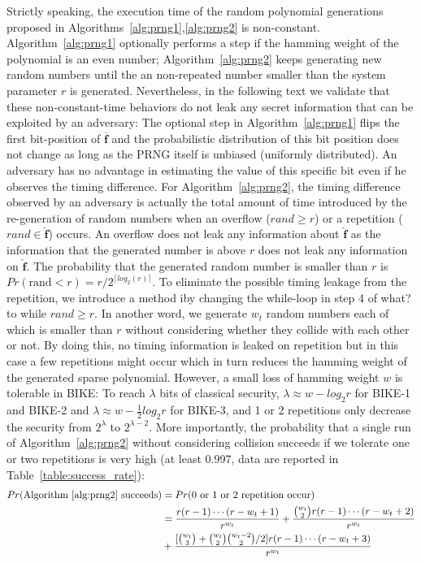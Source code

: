 \documentclass[runningheads]{llncs}
\begin{document}
Strictly speaking, the execution time of the random polynomial generations proposed in 
Algorithms~\ref{alg:prng1},\ref{alg:prng2} is non-constant. 
Algorithm~\ref{alg:prng1} optionally performs a step if the 
hamming weight of the polynomial is an even number; 
Algorithm~\ref{alg:prng2} keeps generating new random numbers 
until the an non-repeated number smaller than the system parameter $r$  
is generated. 
Nevertheless, in the following text we validate that 
these non-constant-time behaviors do not leak any secret 
information that can be exploited by an adversary: 
The optional step in Algorithm~\ref{alg:prng1} 
flips the first bit-position of $\mathbf{\overline{f}}$ 
and the probabilistic distribution of this bit position 
does not change as long as the PRNG itself is unbiased (uniformly distributed). 
An adversary has no advantage in estimating the value 
of this specific bit even if he observes the timing difference. 
For Algorithm~\ref{alg:prng2}, the timing difference 
observed by an adversary is actually the total amount 
of time introduced by the re-generation of random numbers 
when an overflow ($rand\geq r$) or a repetition ($rand\in \mathbf{\hat{f}}$) occurs. 
An overflow does not leak any information about $\mathbf{\hat{f}}$ 
as the information that the generated number is above $r$ does
not leak any information on $\mathbf{\hat{f}}$. 
The probability that the generated random number is smaller 
than $r$ is $Pr(\text{rand} < r)= r/2^{\lceil log_2(r)\rceil}$. 
To eliminate the possible timing leakage from the repetition, 
we introduce a method iby changing the while-loop 
in step 4 {\color{red} of what?} to while $rand\geq r$. 
In another word, we generate $w_t$ random numbers each 
of which is smaller than $r$ without considering whether they collide 
with each other or not. 
By doing this, no timing information is leaked on repetition but 
in this case a few repetitions might occur which in turn reduces 
the hamming weight of the generated sparse polynomial. 
However, a small loss of hamming weight $w$ is tolerable in BIKE: 
To reach $\lambda$ bits of classical security, $\lambda\approx w-log_2r$ for 
BIKE-1 and BIKE-2 and $\lambda\approx w-\frac{1}{2}log_2r$ for BIKE-3, 
and 1 or 2 repetitions only decrease the security from $2^\lambda$ to $2^{\lambda-2}$.
More importantly, the probability that a single run of Algorithm~\ref{alg:prng2} without considering collision succeeds if we tolerate one or two repetitions is very high (at least 0.997, data are reported in Table~\ref{table:success_rate}):
\begin{align}
    Pr(\text{Algorithm~\ref{alg:prng2} succeeds}) &= Pr(\text{0 or 1 or 2 repetition occur})\\
    &=\frac{r(r-1)\cdots (r-w_t+1)}{r^{w_t}}+ \frac{\binom{w_t}{2}r(r-1)\cdots (r-w_t+2)}{r^{w_t}}\\
    &+ \frac{[\binom{w_t}{3}+\binom{w_t}{2}\binom{w_t-2}{2}/2]  r(r-1)\cdots (r-w_t+3) }{r^{w_t}}
\end{align}
\end{document}
